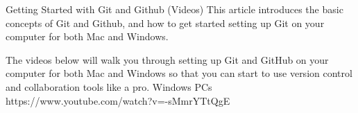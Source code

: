 Getting Started with Git and Github (Videos)
        This article introduces the basic concepts of Git and Github, and how to get started setting up Git on your computer for both Mac and Windows.
    
        The videos below will walk you through setting up Git and GitHub on your computer for both Mac and Windows so that you can start to use version control and collaboration tools like a pro.
Windows PCs
        https://www.youtube.com/watch?v=-sMmrYTtQgE
        